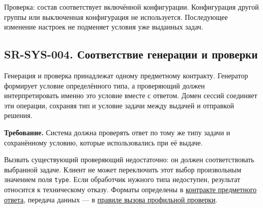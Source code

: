 \documentclass[12pt,a4paper]{article}
\begin{document}
Проверка: состав соответствует включённой конфигурации. Конфигурация другой группы или выключенная конфигурация не используется. Последующее изменение настроек не подменяет условия уже выданных задач.

\subsection{SR-SYS-004. Соответствие генерации и проверки}\label{sr-sys-004-ux441ux43eux43eux442ux432ux435ux442ux441ux442ux432ux438ux435-ux433ux435ux43dux435ux440ux430ux446ux438ux438-ux438-ux43fux440ux43eux432ux435ux440ux43aux438}

\hypertarget{sr-sys-004-соответствие-генерации-и-проверки}{}

Генерация и проверка принадлежат одному предметному контракту. Генератор формирует условие определённого типа, а проверяющий должен интерпретировать именно это условие вместе с ответом. Домен сессий соединяет эти операции, сохраняя тип и условие задачи между выдачей и отправкой решения.

\textbf{Требование.} Система должна проверять ответ по тому же типу задачи и сохранённому условию, которые использовались при её выдаче.

Вызвать существующий проверяющий недостаточно: он должен соответствовать выбранной задаче. Клиент не может переключить этот выбор произвольным значением поля \texttt{type}. Если обработчик нужного типа недоступен, результат относится к техническому отказу. Форматы определены в \href{../07_\%D0\%9F\%D1\%80\%D0\%BE\%D0\%B3\%D1\%80\%D0\%B0\%D0\%BC\%D0\%BC\%D0\%BD\%D1\%8B\%D0\%B5_\%D1\%82\%D1\%80\%D0\%B5\%D0\%B1\%D0\%BE\%D0\%B2\%D0\%B0\%D0\%BD\%D0\%B8\%D1\%8F/DOC-06.2_\%D0\%A1\%D0\%B5\%D1\%81\%D1\%81\%D0\%B8\%D0\%B8_\%D0\%B7\%D0\%B0\%D0\%B4\%D0\%B0\%D1\%87_\%D0\%B8_\%D0\%BF\%D0\%BB\%D0\%B0\%D0\%BD\%D0\%B8\%D1\%80\%D0\%BE\%D0\%B2\%D1\%89\%D0\%B8\%D0\%BA.pdf\#nameddest=\%D0\%BF\%D1\%80\%D0\%B5\%D0\%B4\%D0\%BC\%D0\%B5\%D1\%82\%D0\%BD\%D1\%8B\%D0\%B9-\%D0\%BE\%D1\%82\%D0\%B2\%D0\%B5\%D1\%82}{контракте предметного ответа}, передача данных --- в \href{../07_\%D0\%9F\%D1\%80\%D0\%BE\%D0\%B3\%D1\%80\%D0\%B0\%D0\%BC\%D0\%BC\%D0\%BD\%D1\%8B\%D0\%B5_\%D1\%82\%D1\%80\%D0\%B5\%D0\%B1\%D0\%BE\%D0\%B2\%D0\%B0\%D0\%BD\%D0\%B8\%D1\%8F/DOC-06.2_\%D0\%A1\%D0\%B5\%D1\%81\%D1\%81\%D0\%B8\%D0\%B8_\%D0\%B7\%D0\%B0\%D0\%B4\%D0\%B0\%D1\%87_\%D0\%B8_\%D0\%BF\%D0\%BB\%D0\%B0\%D0\%BD\%D0\%B8\%D1\%80\%D0\%BE\%D0\%B2\%D1\%89\%D0\%B8\%D0\%BA.pdf\#nameddest=swr-ses-010-\%D0\%BF\%D0\%B5\%D1\%80\%D0\%B5\%D0\%B4\%D0\%B0\%D1\%87\%D0\%B0-\%D0\%BF\%D1\%80\%D0\%BE\%D1\%84\%D0\%B8\%D0\%BB\%D1\%8C\%D0\%BD\%D0\%BE\%D0\%B9-\%D0\%BF\%D1\%80\%D0\%BE\%D0\%B2\%D0\%B5\%D1\%80\%D0\%BA\%D0\%B5}{правиле вызова профильной проверки}.
\end{document}
